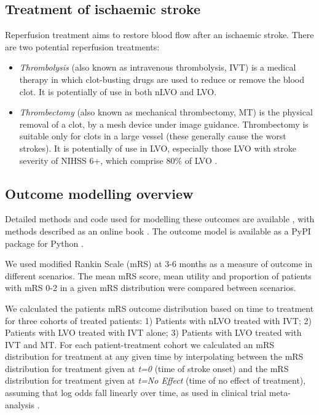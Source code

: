 \subsection{Treatment of ischaemic stroke}

Reperfusion treatment aims to restore blood flow after an ischaemic stroke. There are two potential reperfusion treatments:

\begin{itemize}
    \item \textit{Thrombolysis} (also known as intravenous thrombolysis, IVT) is a medical therapy in which clot-busting drugs are used to reduce or remove the blood clot. It is potentially of use in both nLVO and LVO.
    
    \item \textit{Thrombectomy} (also known as mechanical thrombectomy, MT) is the physical removal of a clot, by a mesh device under image guidance. Thrombectomy is suitable only for clots in a large vessel (these generally cause the worst strokes). It is potentially of use in LVO, especially those LVO with stroke severity of NIHSS 6+, which comprise 80\% of LVO \cite{mcmeekin_estimating_2017}.
\end{itemize}


\subsection{Outcome modelling overview}

Detailed methods and code used for modelling these outcomes are available \cite{github2}, with methods described as an online book \cite{github3}. The outcome model is available as a PyPI package for Python \cite{pypi}.

We used modified Rankin Scale (mRS) at 3-6 months as a measure of outcome in different scenarios. The mean mRS score, mean utility and proportion of patients with mRS 0-2 in a given mRS distribution were compared between scenarios.

We calculated the patients mRS outcome distribution based on time to treatment for three cohorts of treated patients: 1) Patients with nLVO treated with IVT; 2) Patients with LVO treated with IVT alone; 3) Patients with LVO treated with IVT and MT. For each patient-treatment cohort we calculated an mRS distribution for treatment at any given time by interpolating between the mRS distribution for treatment given at \emph{t=0} (time of stroke onset) and the mRS distribution for treatment given at \emph{t=No Effect} (time of no effect of treatment), assuming that log odds fall linearly over time, as used in clinical trial meta-analysis \cite{emberson_effect_2014, fransen_time_2016}.

